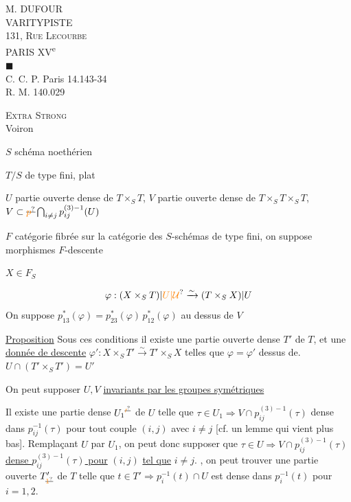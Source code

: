 M. DUFOUR\\
VARITYPISTE\\
131, \textsc{Rue Lecourbe}\\
PARIS XV\textsuperscript{e}\\
$\blacksquare$\\
C. C. P. Paris 14.143-34\\
R. M. 140.029

\textsc{Extra Strong}\\
 Voiron

$S$ schéma noethérien

$T/S$ de type fini,  plat

$U$ partie ouverte dense de $T\times_S T$, $V$ partie ouverte dense de $T\times_S T\times_S T$, $V\subset\deleted{\unsure{p}}\bigcap_{i\ne j}p_{ij}^{(3)-1}(U)$

$F$ catégorie fibrée sur la catégorie des $S$-schémas de type fini, on suppose     morphismes   $F$-descente 

$X\in F_S$

\[
\varphi:(X\times_S T)|\unsure{U|\mathcal{U}}\xrightarrow{\sim}(T\times_S X)|U
\]
On suppose $p_{13}^{*}(\varphi)={p}_{23}^{*}(\varphi)\,p_{12}^{*}(\varphi)$ au dessus de $V$

\uline{Proposition} Sous ces conditions il existe une partie ouverte dense $T'$  de $T$, et une \uline{donnée de descente} $\varphi':X\times_S T'\xrightarrow{\sim}T'\times_S X$ telles que $\varphi=\varphi'$  dessus de. $U\cap(T'\times_S T')=U'$

On peut supposer $U,V$ \uline{invariants par les groupes symétriques}

Il existe une partie  dense $U_{1}{}^{\deleted{\unsure{\prime}}}$ de $U$ telle que $\tau\in U_1\Rightarrow V\cap p_{ij}^{(3)-1}(\tau)$ dense dans $p_{ij}^{-1}(\tau)$ pour tout couple $(i,j)$ avec $i\ne j$ [cf. un lemme qui vient plus bas]. Remplaçant $U$ par $U_1$, on peut donc supposer que \uline{$\tau\in U\Rightarrow V\cap p_{ij}^{(3)-1}(\tau)$ dense  $p_{ij}^{(3)-1}(\tau)$ pour} $(i,j)$ \uline{tel que} $i\ne j$. , on peut trouver une partie ouverte $T'_{\deleted{\unsure{1}}}$ de $T$ telle que $t\in T'\Rightarrow p_i^{-1}(t)\cap U$ est dense dans $p_i^{-1}(t)$ pour $i=1,2$.

